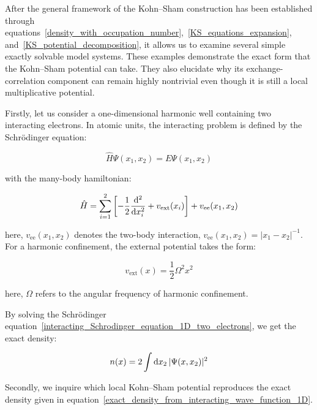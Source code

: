After the general framework of the Kohn--Sham construction has been established through equations~\eqref{density_with_occupation_number},~\eqref{KS_equations_expansion}, and~\eqref{KS_potential_decomposition},
it allows us to examine several simple exactly solvable model systems.
These examples demonstrate the exact form that the Kohn–Sham potential can take.
They also elucidate why its exchange-correlation component can remain highly nontrivial even though it is still a local multiplicative potential.

Firstly, let us consider a one-dimensional harmonic well containing two interacting electrons.
In atomic units, the interacting problem is defined by the Schrödinger equation:

\begin{equation}
    \hat{H}\Psi(x_1,x_2)=E\Psi(x_1,x_2)
\label{interacting_Schrodinger_equation_1D_two_electrons}
\end{equation}

with the many-body hamiltonian:

\begin{equation}
    \hat{H}
    = \sum_{i=1}^{2}\left[-\frac{1}{2}\frac{\mathrm{d}^2}{\mathrm{d} x_i^2}+v_\mathrm{ext}(x_i)\right]
    + v_\mathrm{ee}(x_1,x_2)
\label{interacting_hamiltonian_1D_two_electrons}
\end{equation}

here, $v_\mathrm{ee}(x_1,x_2)$ denotes the two-body interaction, $v_\mathrm{ee}(x_1,x_2)=|x_1-x_2|^{-1}$. For a harmonic confinement, the external potential takes the form:

\begin{equation}
    v_\mathrm{ext}(x)=\frac{1}{2}\Omega^2 x^2
\label{harmonic_external_potential_1D}
\end{equation}

here, $\Omega$ refers to the angular frequency of harmonic confinement.

By solving the Schrödinger equation~\eqref{interacting_Schrodinger_equation_1D_two_electrons},
we get the exact density:

\begin{equation}
    n(x)=2\int\mathrm{d}{x_2}\,|\Psi(x,x_2)|^2
\label{exact_density_from_interacting_wave_function_1D}
\end{equation}

Secondly, we inquire which local Kohn--Sham potential reproduces the exact density given in equation~\eqref{exact_density_from_interacting_wave_function_1D}.

